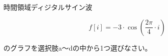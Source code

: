 時間領域ディジタルサイン波 

\[
f[i] = -3 \cdot \cos \left ( \frac{2 \pi}{4}  \cdot i \right )
\]

\noindent のグラフを選択肢a〜dの中から1つ選びなさい。
